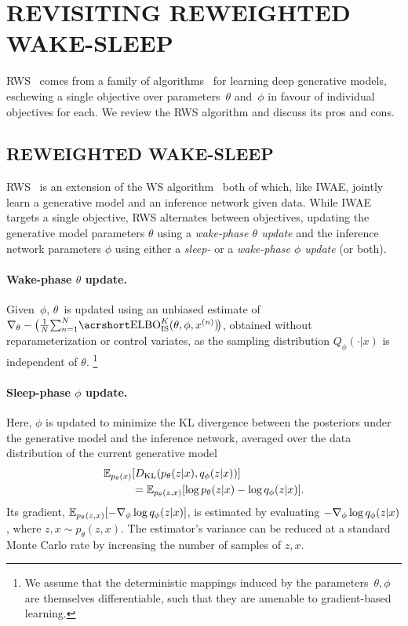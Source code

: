 
\section{REVISITING REWEIGHTED WAKE-SLEEP}
\label{sec:method}

\Acrfull{RWS}~\citep{bornschein2015reweighted} comes from a family of algorithms~\citep{hinton1995wake,dayan1995helmholtz} for learning deep generative models, eschewing a single objective over parameters~\(\theta\) and~\(\phi\) in favour of individual objectives for each.
%
We review the \gls{RWS} algorithm and discuss its pros and cons.

\subsection{REWEIGHTED WAKE-SLEEP}

\Acrfull{RWS}~\citep{bornschein2015reweighted} is an extension of the \acrlong{WS} algorithm~\citep{hinton1995wake,dayan1995helmholtz} both of which, like \gls{IWAE}, jointly learn a generative model and an inference network given data.
%
While \gls{IWAE} targets a single objective, \gls{RWS} alternates between objectives, updating the generative model parameters $\theta$ using a \emph{wake-phase $\theta$ update} and the inference network parameters $\phi$ using either a \emph{sleep-} or a \emph{wake-phase $\phi$ update} (or both).

\paragraph{Wake-phase $\theta$ update.}%
%
Given~$\phi$, $\theta$~is updated using an unbiased estimate of $\nabla_\theta -\big(\frac{1}{N}\!\sum_{n = 1}^N \!\ELBO_{\text{IS}}^K(\theta, \phi, x^{(n)})\!\big)$, obtained without reparameterization or control variates, as the sampling distribution $Q_\phi(\cdot | x)$ is independent of $\theta$\!.%
%
\footnote{We assume that the deterministic mappings induced by the parameters~\(\theta, \phi\) are themselves differentiable, such that they are amenable to gradient-based learning.}

\paragraph{Sleep-phase $\phi$ update.}%
%
Here, $\phi$ is updated to minimize the \gls{KL} divergence between the posteriors under the generative model and the inference network, averaged over the data distribution of the current generative model
%
\begin{align}
  \mathbb{E}_{p_\theta(x)}&[D_{\mathrm{KL}}(p_\theta(z \lvert x), q_\phi(z \lvert x))] \nonumber\\
  &= \mathbb{E}_{p_\theta(z, x)}[\log p_\theta(z \lvert x) - \log q_\phi(z \lvert x)].
  \label{eq:sleep-phi-obj}
\end{align}
%
Its gradient, $\mathbb{E}_{p_\theta(z, x)}[-\nabla_\phi \log q_\phi(z \lvert x)]$, is estimated by evaluating $-\nabla_\phi \log q_\phi(z \lvert x)$, where $z, x \sim p_\theta(z, x)$.
%
The estimator's variance can be reduced at a standard Monte Carlo rate by increasing the number of samples of $z, x$.

